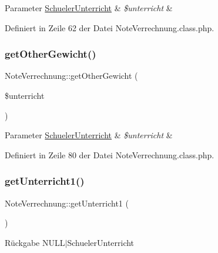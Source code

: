 \begin{DoxyParams}[1]{Parameter}
\mbox{\hyperlink{class_schueler_unterricht}{Schueler\+Unterricht}} & {\em \$unterricht} & \\
\hline
\end{DoxyParams}


Definiert in Zeile 62 der Datei Note\+Verrechnung.\+class.\+php.

\mbox{\label{class_note_verrechnung_a5407fbfcaeadd642e0bcd791b21e2b31}} 
\subsubsection{\texorpdfstring{get\+Other\+Gewicht()}{getOtherGewicht()}}
{\footnotesize\ttfamily Note\+Verrechnung\+::get\+Other\+Gewicht (\begin{DoxyParamCaption}\item[{}]{\$unterricht }\end{DoxyParamCaption})}


\begin{DoxyParams}[1]{Parameter}
\mbox{\hyperlink{class_schueler_unterricht}{Schueler\+Unterricht}} & {\em \$unterricht} & \\
\hline
\end{DoxyParams}


Definiert in Zeile 80 der Datei Note\+Verrechnung.\+class.\+php.

\mbox{\label{class_note_verrechnung_af20aab7ad43010ff9516ce978e07ac06}} 
\subsubsection{\texorpdfstring{get\+Unterricht1()}{getUnterricht1()}}
{\footnotesize\ttfamily Note\+Verrechnung\+::get\+Unterricht1 (\begin{DoxyParamCaption}{ }\end{DoxyParamCaption})}

\begin{DoxyReturn}{Rückgabe}
N\+U\+L\+L$\vert$\+Schueler\+Unterricht 
\end{DoxyReturn}


